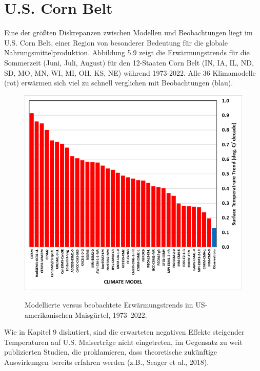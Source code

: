 \documentclass[12pt,paper=a4,DIV=12,parskip=never,chapterprefix=false,headings=standardclasses]{scrreprt}
\begin{document}
\section{U.S. Corn Belt}
Eine der größten Diskrepanzen zwischen Modellen und Beobachtungen liegt im U.S. Corn Belt, einer Region von besonderer Bedeutung für die globale Nahrungsmittelproduktion. Abbildung 5.9 zeigt die Erwärmungstrends für die Sommerzeit (Juni, Juli, August) für den 12-Staaten Corn Belt (IN, IA, IL, ND, SD, MO, MN, WI, MI, OH, KS, NE) während 1973-2022. Alle 36 Klimamodelle (rot) erwärmen sich viel zu schnell verglichen mit Beobachtungen (blau).

\begin{figure}[H]
\begin{center}
\includegraphics[width=1.0\textwidth]{bilder/bilderKlima-0034.png}\\[1cm]
\end{center}
\caption{Modellierte versus beobachtete Erwärmungstrends im US-amerikanischen Maisgürtel, 1973–2022.}
\end{figure}

Wie in Kapitel 9 diskutiert, sind die erwarteten negativen Effekte steigender Temperaturen auf U.S. Maiserträge nicht eingetreten, im Gegensatz zu weit publizierten Studien, die proklamieren, dass theoretische zukünftige Auswirkungen bereits erfahren werden (z.B., Seager et al., 2018).
\end{document}
